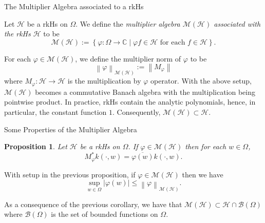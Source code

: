 \documentclass[handout]{beamer}
\newtheorem{proposition}[theorem]{Proposition}
\newcommand{\C}{\mathbb C}
\newcommand{\calB}{{\mathcal B}}
\newcommand{\calH}{{\mathcal H}}
\newcommand{\calM}{{\mathcal M}}
\newcommand{\norm}[1]{\left\lVert #1 \right\rVert}
\newcommand{\abs}[1]{\left\lvert #1 \right\rvert}
\begin{document}
\begin{frame}{The Multiplier Algebra associated to a rkHs}
\begin{definition}
Let $\calH$ be a rkHs on $\Omega$. We define the \textit{multiplier algebra $\calM \left( \calH \right)$ associated with the rkHs $\calH$} to be
\begin{equation*}
\calM \left( \calH \right) := \left\{ \varphi :  \Omega \to \C  \mid \varphi f \in \calH \text{ for each } f \in \calH \right\}.
\end{equation*}
\label{def:mult-alg}
\end{definition}
For each $\varphi \in \calM \left( \calH \right)$, we define the multiplier norm of $\varphi$ to be 
\begin{equation*}
\norm{\varphi}_{\calM \left( \calH \right)} := \norm{M_{\varphi}}
\end{equation*}
where $M_{\varphi} : \calH \to \calH$ is the multiplication by $\varphi$ operator.
\pause
With the above setup, $\calM \left( \calH \right)$ becomes a commutative Banach algebra with the multiplication being pointwise product.
\pause
In practice, rkHs contain the analytic polynomials, hence, in particular, the constant function $1$. Consequently, $\calM \left( \calH \right) \subset \calH$.
\end{frame}

\begin{frame}{Some Properties of the Multiplier Algebra}
\begin{proposition}
Let $\calH$ be a rkHs on $\Omega$. If $\varphi \in \calM \left( \calH \right)$ then for each $w\in \Omega$, 
\begin{equation*}
M_{\varphi}^{*} k\left( \cdot , w \right) = \overline{\varphi (w)} k\left( \cdot , w \right).
\end{equation*}
\end{proposition}
\pause
\begin{corollary}
With setup in the previous proposition, if $\varphi \in \calM \left( \calH \right)$ then we have
\begin{equation*}
\sup_{w\in \Omega} \abs{\varphi (w)} \le \norm{\varphi}_{\calM \left( \calH \right)}.
\end{equation*}
\label{cor:boundedness-of-multiplier}
\end{corollary}
\pause
\label{prop:adjoint-eigenvalue}
As a consequence of the previous corollary, we have that $\calM \left( \calH \right) \subset \calH \cap \calB \left( \Omega \right)$ where $\calB \left( \Omega \right)$ is the set of bounded functions on $\Omega$.
\end{frame}
\end{document}
